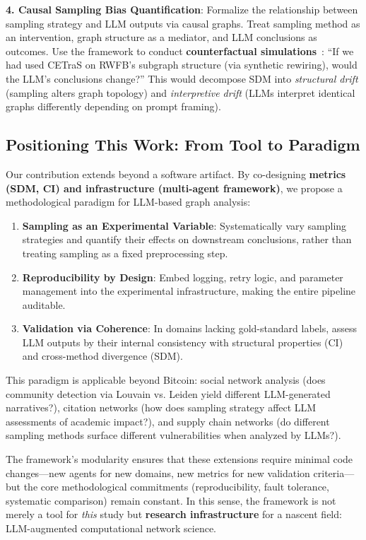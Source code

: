 \textbf{4. Causal Sampling Bias Quantification}: Formalize the relationship between sampling strategy and LLM outputs via causal graphs. Treat sampling method as an intervention, graph structure as a mediator, and LLM conclusions as outcomes. Use the framework to conduct \textbf{counterfactual simulations}~\cite{pearl2009causality}: ``If we had used CETraS on RWFB's subgraph structure (via synthetic rewiring), would the LLM's conclusions change?'' This would decompose SDM into \textit{structural drift} (sampling alters graph topology) and \textit{interpretive drift} (LLMs interpret identical graphs differently depending on prompt framing).

\subsection{Positioning This Work: From Tool to Paradigm}

Our contribution extends beyond a software artifact. By co-designing \textbf{metrics (SDM, CI) and infrastructure (multi-agent framework)}, we propose a methodological paradigm for LLM-based graph analysis:
\begin{enumerate}
    \item \textbf{Sampling as an Experimental Variable}: Systematically vary sampling strategies and quantify their effects on downstream conclusions, rather than treating sampling as a fixed preprocessing step.
    \item \textbf{Reproducibility by Design}: Embed logging, retry logic, and parameter management into the experimental infrastructure, making the entire pipeline auditable.
    \item \textbf{Validation via Coherence}: In domains lacking gold-standard labels, assess LLM outputs by their internal consistency with structural properties (CI) and cross-method divergence (SDM).
\end{enumerate}

This paradigm is applicable beyond Bitcoin: social network analysis (does community detection via Louvain vs. Leiden yield different LLM-generated narratives?), citation networks (how does sampling strategy affect LLM assessments of academic impact?), and supply chain networks (do different sampling methods surface different vulnerabilities when analyzed by LLMs?).

The framework's modularity ensures that these extensions require minimal code changes---new agents for new domains, new metrics for new validation criteria---but the core methodological commitments (reproducibility, fault tolerance, systematic comparison) remain constant. In this sense, the framework is not merely a tool for \textit{this} study but \textbf{research infrastructure} for a nascent field: LLM-augmented computational network science.


